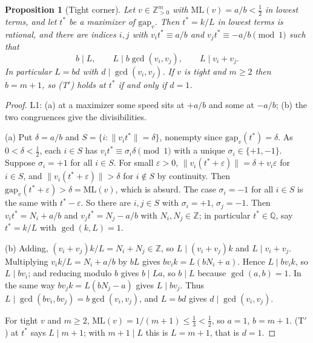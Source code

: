 \documentclass[11pt]{article}
\newtheorem{proposition}[theorem]{Proposition}
\theoremstyle{remark}
\newcommand{\norm}[1]{\lVert #1\rVert}
\newcommand{\ML}{\mathrm{ML}}
\newcommand{\gap}{\mathrm{gap}}
\newcommand{\Z}{\mathbb{Z}}
\begin{document}
\begin{proposition}[Tight corner]\label{prop:corner}
Let $v\in\Z_{>0}^m$ with $\ML(v)=a/b<\frac12$ in lowest terms, and let $t^*$ be a maximizer of $\gap_v$. Then $t^*=k/L$ in lowest terms is rational, and there are indices $i,j$ with $v_it^*\equiv a/b$ and $v_jt^*\equiv-a/b\pmod 1$ such that
\[
b\mid L,\qquad L\mid b\gcd(v_i,v_j),\qquad L\mid v_i+v_j .
\]
In particular $L=bd$ with $d\mid\gcd(v_i,v_j)$. If $v$ is tight and $m\ge2$ then $b=m+1$, so (T$'$) holds at $t^*$ if and only if $d=1$.
\end{proposition}
\begin{proof}
L1: (a) at a maximizer some speed sits at $+a/b$ and some at $-a/b$; (b) the two congruences give the divisibilities.

(a) Put $\delta=a/b$ and $S=\{i:\norm{v_it^*}=\delta\}$, nonempty since $\gap_v(t^*)=\delta$. As $0<\delta<\frac12$, each $i\in S$ has $v_it^*\equiv\sigma_i\delta\pmod 1$ with a unique $\sigma_i\in\{+1,-1\}$. Suppose $\sigma_i=+1$ for all $i\in S$. For small $\varepsilon>0$, $\norm{v_i(t^*+\varepsilon)}=\delta+v_i\varepsilon$ for $i\in S$, and $\norm{v_i(t^*+\varepsilon)}>\delta$ for $i\notin S$ by continuity. Then $\gap_v(t^*+\varepsilon)>\delta=\ML(v)$, which is absurd. The case $\sigma_i=-1$ for all $i\in S$ is the same with $t^*-\varepsilon$. So there are $i,j\in S$ with $\sigma_i=+1$, $\sigma_j=-1$. Then $v_it^*=N_i+a/b$ and $v_jt^*=N_j-a/b$ with $N_i,N_j\in\Z$; in particular $t^*\in\mathbb Q$, say $t^*=k/L$ with $\gcd(k,L)=1$.

(b) Adding, $(v_i+v_j)k/L=N_i+N_j\in\Z$, so $L\mid(v_i+v_j)k$ and $L\mid v_i+v_j$. Multiplying $v_ik/L=N_i+a/b$ by $bL$ gives $bv_ik=L(bN_i+a)$. Hence $L\mid bv_ik$, so $L\mid bv_i$; and reducing modulo $b$ gives $b\mid La$, so $b\mid L$ because $\gcd(a,b)=1$. In the same way $bv_jk=L(bN_j-a)$ gives $L\mid bv_j$. Thus $L\mid\gcd(bv_i,bv_j)=b\gcd(v_i,v_j)$, and $L=bd$ gives $d\mid\gcd(v_i,v_j)$.

For tight $v$ and $m\ge2$, $\ML(v)=1/(m+1)\le\frac13<\frac12$, so $a=1$, $b=m+1$. (T$'$) at $t^*$ says $L\mid m+1$; with $m+1\mid L$ this is $L=m+1$, that is $d=1$.
\end{proof}
\end{document}

